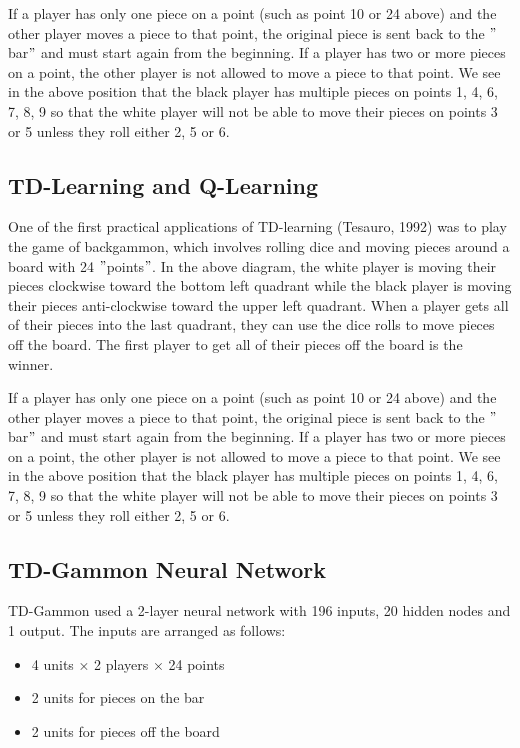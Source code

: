 \documentclass[11pt]{article}
\begin{document}
If a player has only one piece on a point (such as point 10 or 24 above) and
the other player moves a piece to that point, the original piece is sent back
to the \("\)bar\("\) and must start again from the beginning.
If a player has two or more pieces on a point, the other player is not allowed
to move a piece to that point.
We see in the above position that the black player has multiple pieces on
points 1, 4, 6, 7, 8, 9 so that the white player will not be able to move their
pieces on points 3 or 5 unless they roll either 2, 5 or 6.

\subsection{TD-Learning and Q-Learning}\label{subsec:td-learning-and-q-learning2}
One of the first practical applications of TD-learning (Tesauro, 1992) was to
play the game of backgammon, which involves rolling dice and moving pieces
around a board with 24 \("\)points\("\).
In the above diagram, the white player is moving their pieces clockwise toward
the bottom left quadrant while the black player is moving their pieces
anti-clockwise toward the upper left quadrant.
When a player gets all of their pieces into the last quadrant, they can use the
dice rolls to move pieces off the board.
The first player to get all of their pieces off the board is the winner.

If a player has only one piece on a point (such as point 10 or 24 above) and
the other player moves a piece to that point, the original piece is sent back
to the \("\)bar\("\) and must start again from the beginning.
If a player has two or more pieces on a point, the other player is not allowed
to move a piece to that point.
We see in the above position that the black player has multiple pieces on
points 1, 4, 6, 7, 8, 9 so that the white player will not be able to move their
pieces on points 3 or 5 unless they roll either 2, 5 or 6.

\subsection{TD-Gammon Neural Network}\label{subsec:td-gammon-neural-network}
TD-Gammon used a 2-layer neural network with 196 inputs, 20 hidden nodes and 1
output.
The inputs are arranged as follows:
\begin{itemize}
  \item 4 units × 2 players × 24 points
  \item 2 units for pieces on the bar
  \item 2 units for pieces off the board
\end{itemize}
\end{document}
